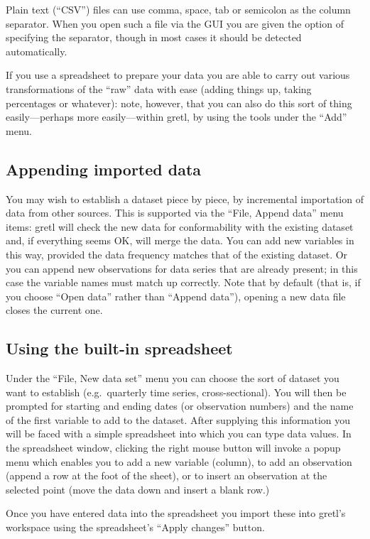 Plain text (``CSV'') files can use comma, space, tab or semicolon as
the column separator.  When you open such a file via the GUI you are
given the option of specifying the separator, though in most cases it
should be detected automatically.

If you use a spreadsheet to prepare your data you are able to carry
out various transformations of the ``raw'' data with ease (adding
things up, taking percentages or whatever): note, however, that you
can also do this sort of thing easily---perhaps more easily---within
gretl, by using the tools under the ``Add'' menu.

\subsection{Appending imported data}

You may wish to establish a dataset piece by piece, by incremental
importation of data from other sources.  This is supported via the
``File, Append data'' menu items: gretl will check the new data for
conformability with the existing dataset and, if everything seems OK,
will merge the data.  You can add new variables in this way, provided
the data frequency matches that of the existing dataset.  Or you can
append new observations for data series that are already present; in
this case the variable names must match up correctly.  Note that by
default (that is, if you choose ``Open data'' rather than ``Append
data''), opening a new data file closes the current one.

\subsection{Using the built-in spreadsheet}

Under the ``File, New data set'' menu you can choose the sort of
dataset you want to establish (e.g.\ quarterly time series,
cross-sectional).  You will then be prompted for starting and ending
dates (or observation numbers) and the name of the first variable to
add to the dataset. After supplying this information you will be faced
with a simple spreadsheet into which you can type data values.  In the
spreadsheet window, clicking the right mouse button will invoke a
popup menu which enables you to add a new variable (column), to add an
observation (append a row at the foot of the sheet), or to insert an
observation at the selected point (move the data down and insert a
blank row.)

Once you have entered data into the spreadsheet you import these into
gretl's workspace using the spreadsheet's ``Apply changes''
button.

